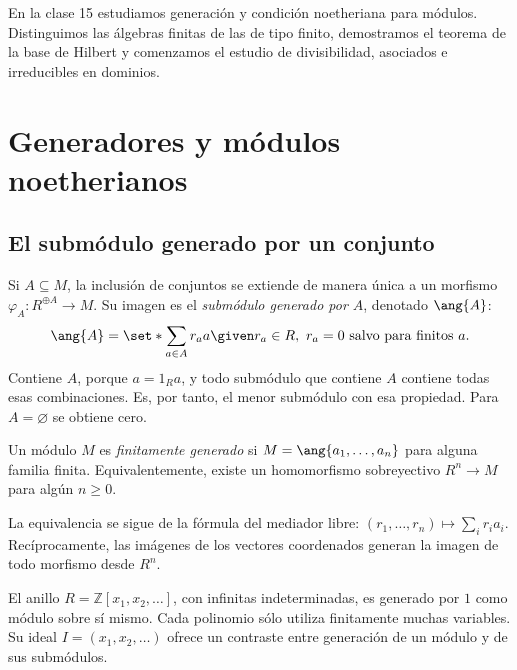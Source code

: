 En la clase 15 estudiamos generación y condición noetheriana para módulos. Distinguimos las álgebras finitas de las de tipo finito, demostramos el teorema de la base de Hilbert y comenzamos el estudio de divisibilidad, asociados e irreducibles en dominios.

\section{Generadores y módulos noetherianos}
\subsection{El submódulo generado por un conjunto}
Si $A\subseteq M$, la inclusión de conjuntos se extiende de manera única a un morfismo $\varphi_A:R^{\oplus A}\to M$. Su imagen es el \emph{submódulo generado por $A$}, denotado $\ang{A}$:
\[
\ang{A}=\set*{\sum_{a\in A}r_aa\given
 r_a\in R,\ r_a=0\text{ salvo para finitos }a}.
\]
Contiene $A$, porque $a=1_Ra$, y todo submódulo que contiene $A$ contiene todas esas combinaciones. Es, por tanto, el menor submódulo con esa propiedad. Para $A=\varnothing$ se obtiene cero.

\begin{defi}
Un módulo $M$ es \emph{finitamente generado} si $M=\ang{a_1,\ldots,a_n}$ para alguna familia finita. Equivalentemente, existe un homomorfismo sobreyectivo $R^n\to M$ para algún $n\geq0$.
\end{defi}
La equivalencia se sigue de la fórmula del mediador libre: $(r_1,\ldots,r_n)\mapsto\sum_i r_ia_i$. Recíprocamente, las imágenes de los vectores coordenados generan la imagen de todo morfismo desde $R^n$.

\begin{ejem}
El anillo $R=\mathbb Z[x_1,x_2,\ldots]$, con infinitas indeterminadas, es generado por $1$ como módulo sobre sí mismo. Cada polinomio sólo utiliza finitamente muchas variables. Su ideal $I=(x_1,x_2,\ldots)$ ofrece un contraste entre generación de un módulo y de sus submódulos.
\end{ejem}

